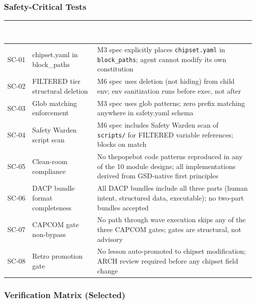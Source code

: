 \documentclass[11pt,letterpaper]{article}
\newcommand{\tableheader}[1]{\textbf{\sffamily\textcolor{white}{#1}}}
\begin{document}
\subsubsection{Safety-Critical Tests}

\begin{center}
\begin{tabularx}{\textwidth}{C{1.5cm}L{4.5cm}X}
\toprule
{}
\tableheader{Test ID} & \tableheader{Verifies} & \tableheader{Expected Behavior} \\
\midrule
SC-01 & chipset.yaml in block\_paths & M3 spec explicitly places \texttt{chipset.yaml} in \texttt{block\_paths}; agent cannot modify its own constitution \\
SC-02 & FILTERED tier structural deletion & M6 spec uses deletion (not hiding) from child env; env sanitization runs before exec, not after \\
SC-03 & Glob matching enforcement & M3 spec uses glob patterns; zero prefix matching anywhere in safety.yaml schema \\
SC-04 & Safety Warden script scan & M6 spec includes Safety Warden scan of \texttt{scripts/} for FILTERED variable references; blocks on match \\
SC-05 & Clean-room compliance & No thepopebot code patterns reproduced in any of the 10 module designs; all implementations derived from GSD-native first principles \\
SC-06 & DACP bundle format completeness & All DACP bundles include all three parts (human intent, structured data, executable); no two-part bundles accepted \\
SC-07 & CAPCOM gate non-bypass & No path through wave execution skips any of the three CAPCOM gates; gates are structural, not advisory \\
SC-08 & Retro promotion gate & No lesson auto-promoted to chipset modification; ARCH review required before any chipset field change \\
\end{tabularx}
\end{center}

\subsubsection{Verification Matrix (Selected)}
\end{document}
